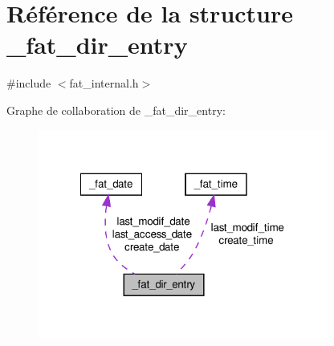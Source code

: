 \hypertarget{struct__fat__dir__entry}{\section{Référence de la structure \-\_\-fat\-\_\-dir\-\_\-entry}
\label{struct__fat__dir__entry}
}


{\ttfamily \#include $<$fat\-\_\-internal.\-h$>$}



Graphe de collaboration de \-\_\-fat\-\_\-dir\-\_\-entry\-:\nopagebreak
\begin{figure}[H]
\begin{center}
\leavevmode
\includegraphics[width=270pt]{struct__fat__dir__entry__coll__graph}
\end{center}
\end{figure}
